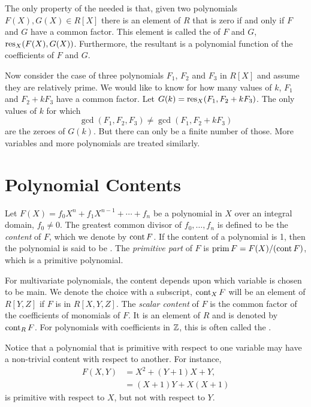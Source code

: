 The only property of the  needed is that, given two
polynomials $F(X), G(X) \in R[X]$ there is an element of $R$ that is zero
if and only if $F$ and $G$ have a common factor. This element is called 
the  of $F$ and $G$, $\mathop{\rm res}\nolimits_X(F(X), G(X))$. Furthermore, the
resultant is a polynomial function of the coefficients of $F$ and $G$.

Now consider the case of three polynomials $F_1$, $F_2$ and
$F_3$ in $R[X]$ and assume they are relatively prime.  We would like
to know for how many values of $k$, $F_1$ and $F_2 + k F_3$ have a
common factor.  Let $G(k) = \mathop{\rm res}\nolimits_X (F_1, F_2 + k F_3)$.  The only
values of $k$ for which 
\[
\gcd(F_1, F_2, F_3) \not= \gcd(F_1, F_2 + k F_3)
\]
are the zeroes of $G(k)$.  But there can only be a finite number of
those.  More variables and more polynomials are treated similarly.

\section{Polynomial Contents}
\label{PRS:Content:Sec}



Let $F(X) = f_0 X^n + f_{1} X^{n-1} + \cdots + f_n$ be a polynomial in
$X$ over an integral domain, $f_0\not=0$.  The greatest common divisor
of $f_0, \ldots, f_n$ is defined to be the {\em content} of
$F$, which we denote by $\mathop{\rm cont}\nolimits F$.  If
the content of a polynomial is 1, then the polynomial is said to be
.  The {\em primitive part} of
$F$ is $\mathop{\rm prim}\nolimits F = F(X)/(\mathop{\rm cont}\nolimits F)$, which
is a primitive polynomial.

For multivariate polynomials, the content depends upon which variable
is chosen to be main.  We denote the choice with a subscript,
\eg{} $\mathop{\rm cont}\nolimits_{X} F$ will be an element of $R[Y,Z]$ if $F$ is in $R[X,
Y,Z]$.  The {\em scalar content} of $F$ is the common factor of the coefficients of
monomials of $F$.  It is an element of $R$ and is denoted by
$\mathop{\rm cont}\nolimits_{R} F$.  For polynomials with coefficients in $\mathbb{Z}$, this is
often called the .

Notice that a polynomial that is primitive with respect to one
variable may have a non-trivial content with respect to another.  For
instance,
\[
\begin{aligned}
F(X, Y) & = X^2 + (Y + 1) X + Y, \\
  & = (X+1) Y + X (X+1)
\end{aligned}
\]
is primitive with respect to $X$, but not with respect to $Y$.


